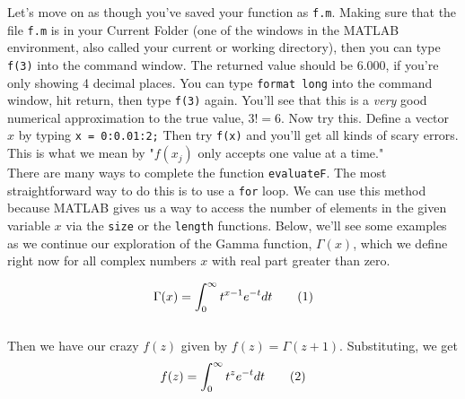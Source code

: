 \documentclass{article}
\newcommand\numberthis{\addtocounter{equation}{1}\tag{\theequation}}
\begin{document}
Let's move on as though you've saved your function as \texttt{f.m}. Making sure that the file \texttt{f.m} is in your Current Folder (one of the windows in the MATLAB environment, also called your current or working directory), then you can type \texttt{f(3)} into the command window. The returned value should be $6.000$, if you're only showing 4 decimal places. You can type \texttt{format long} into the command window, hit return, then type \texttt{f(3)} again. You'll see that this is a \textit{very} good numerical approximation to the true value, $3! = 6$. Now try this. Define a vector $x$ by typing \texttt{x = 0:0.01:2;} Then try \texttt{f(x)} and you'll get all kinds of scary errors. This is what we mean by "$f(x_j)$ only accepts one value at a time."\\

There are many ways to complete the function \texttt{evaluateF}. The most straightforward way to do this is to use a \texttt{for} loop. We can use this method because MATLAB gives us a way to access the number of elements in the given variable $x$ via the \texttt{size} or the \texttt{length} functions. Below, we'll see some examples as we continue our exploration of the Gamma function, $\Gamma (x)$, which we define right now for all complex numbers $x$ with real part greater than zero.

\[
\Gamma (x) = \int_0^\infty t^{x-1} e^{-t} dt \numberthis
\] \\

{\setlength{\parindent}{0cm}
Then we have our crazy $f(z)$ given by $f(z) = \Gamma (z+1)$. Substituting, we get} \\

\[
f(z) = \int_0^\infty t^{z} e^{-t} dt \numberthis
\] \\
\end{document}
